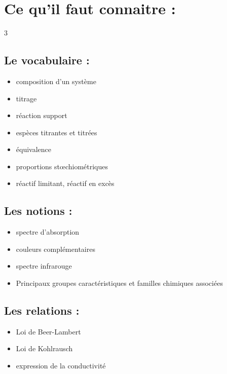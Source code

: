 \documentclass[a4paper,11pt,fleqn]{article}%
\begin{document}
\maketitle

\section*{Ce qu'il faut connaitre :}
\begin{multicols}{3}
\subsection*{Le vocabulaire :}
\begin{itemize}[label=$\square$, itemsep=0pt]
    \item composition d'un système
    \item titrage
    \item réaction support
    \item espèces titrantes et titrées
    \item équivalence
    \item proportions st\oe chiométriques
    \item réactif limitant, réactif en excès
    \end{itemize}
\subsection*{Les notions :}
    \begin{itemize}[label=$\square$, itemsep=0pt]
    \item spectre d'absorption
    \item couleurs complémentaires
    \item spectre infrarouge
    \item Principaux groupes caractéristiques et familles chimiques associées
    \end{itemize}
\subsection*{Les relations :}
    \begin{itemize}[label=$\square$, itemsep=0pt]
        \item Loi de Beer-Lambert
        \item Loi de Kohlrausch
        \item expression de la conductivité
    \end{itemize}

\end{multicols}
\end{document}
